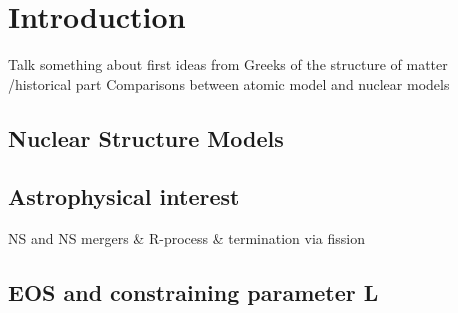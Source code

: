 \section{Introduction}
Talk something about first ideas from Greeks of the structure of matter /historical part
Comparisons between atomic model and nuclear models
\subsection{Nuclear Structure Models}
\subsection{Astrophysical interest}
NS and NS mergers \&    R-process \& termination via fission
\subsection{EOS and constraining parameter L}
